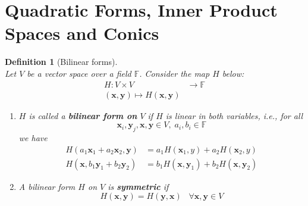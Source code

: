 \documentclass[12pt]{article}
\newtheorem{definition}{Definition}[section]
\theoremstyle{definition}
\begin{document}
\section{Quadratic Forms, Inner Product Spaces and Conics}
\begin{definition}[Bilinear forms]
\hfill\\\normalfont Let $V$ be a vector space over a field $\mathbb{F}$. Consider the map $H$ below:
\[
\begin{aligned}
H:V\times V&\to \mathbb{F}\\
(\mathbf{x},\mathbf{y})\mapsto H(\mathbf{x},\mathbf{y})
\end{aligned}
\]
\begin{enumerate}[label=(\arabic*)]
\item $H$ is called a \textbf{bilinear form on} $V$ if $H$ is linear in both variables, i.e., for all
\[
\mathbf{x}_i, \mathbf{y}_j,\mathbf{x},\mathbf{y}\in V,\;a_i,b_i\in\mathbb{F}
\]
we have
\[
\begin{aligned}
H(a_1\mathbf{x}_1+a_2\mathbf{x}_2,\mathbf{y})&=a_1H(\mathbf{x}_1,y)+a_2H(\mathbf{x}_2,y)\\
H(\mathbf{x},b_1\mathbf{y}_1+b_2\mathbf{y}_2)&=b_1H(\mathbf{x},\mathbf{y}_1)+b_2H(\mathbf{x},\mathbf{y}_2)
\end{aligned}
\]
\item A bilinear form $H$ on $V$ is \textbf{symmetric} if
\[
H(\mathbf{x},\mathbf{y})=H(\mathbf{y},\mathbf{x})\;\;\;\forall \mathbf{x},\mathbf{y}\in V
\]
\end{enumerate}
\end{definition}
\end{document}
